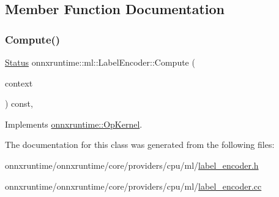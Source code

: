 \subsection{Member Function Documentation}
\mbox{\label{classonnxruntime_1_1ml_1_1LabelEncoder_a931b45722e9ef023d416479e4246fc64}} 
\subsubsection{\texorpdfstring{Compute()}{Compute()}}
{\footnotesize\ttfamily \mbox{\hyperlink{classonnxruntime_1_1common_1_1Status}{Status}} onnxruntime\+::ml\+::\+Label\+Encoder\+::\+Compute (\begin{DoxyParamCaption}\item[{\mbox{\hyperlink{classonnxruntime_1_1OpKernelContext}{Op\+Kernel\+Context}} $\ast$}]{context }\end{DoxyParamCaption}) const\hspace{0.3cm}{\ttfamily [override]}, {\ttfamily [virtual]}}



Implements \mbox{\hyperlink{classonnxruntime_1_1OpKernel_a9eca8656a78b1b3ab9d3351a12798650}{onnxruntime\+::\+Op\+Kernel}}.



The documentation for this class was generated from the following files\+:\begin{DoxyCompactItemize}
\item 
onnxruntime/onnxruntime/core/providers/cpu/ml/\mbox{\hyperlink{label__encoder_8h}{label\+\_\+encoder.\+h}}\item 
onnxruntime/onnxruntime/core/providers/cpu/ml/\mbox{\hyperlink{label__encoder_8cc}{label\+\_\+encoder.\+cc}}\end{DoxyCompactItemize}

